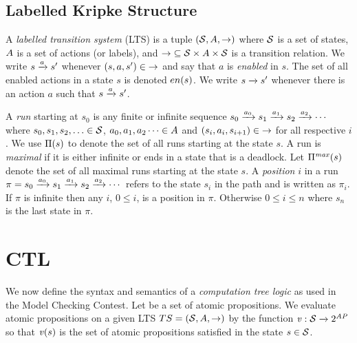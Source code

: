 \documentclass{article}
\begin{document}
\subsection{Labelled Kripke Structure}

A \emph{labelled transition system} (LTS) is a 
tuple $(\mathcal{S}, A, \mathcal{\rightarrow})$ where $\mathcal{S}$ is a 
set of states, $A$ is a set of actions (or labels), 
and $\mathcal{\rightarrow}{} \subseteq \mathcal{S} \times A \times \mathcal{S}$ is a transition relation. We write $s \rtrans[a] s'$ 
whenever $(s,a,s') \in \mathcal{\rightarrow}$ and say that $a$ is \emph{enabled} in $s$.
The set of all enabled actions in a state $s$ is denoted $en(s)$.
We write $s \rtrans s'$ whenever there is an action $a$ such that
$s \rtrans[a] s'$.

A \emph{run} starting at $s_0$ is any finite or infinite sequence
$s_0 \rtrans[a_0] s_1 \rtrans[a_1] s_2 \rtrans[a_2] \cdots$ where
$s_0, s_1, s_2, \ldots \in \mathcal{S}$, 
$a_0, a_1, a_2 \cdots \in A$ and
$(s_i,a_i,s_{i+1}) \in \mathcal{\rightarrow}$ for all respective $i$.
We use $\Pi(s)$ to denote the set of all runs starting at the state $s$.
A run is \emph{maximal} if it is either infinite or ends in a state that
is a deadlock.  Let $\Pi^{\mathit{max}}(s)$ denote the set of all maximal 
runs starting at the state $s$.
A \emph{position} $i$ in a run $\pi = 
s_0 \rtrans[a_0] s_1 \rtrans[a_1] s_2 \rtrans[a_2] \cdots$
refers to the state $s_i$ in the path and is written as $\pi_i$.
If $\pi$ is infinite then any $i$, $0 \leq i$, is a position in $\pi$.
Otherwise $0 \leq i \leq n$ where $s_n$ is the last state in $\pi$.

\section{CTL}

We now define the syntax and semantics of a \emph{computation tree logic} 
as used in the Model Checking Contest.
Let \props be a set of atomic propositions.
We evaluate atomic propositions on a given LTS
$TS = (\mathcal{S}, A, \mathcal{\rightarrow})$ 
by the function $\mathit{v} : \mathcal{S} \xrightarrow{} 2^{\mathit{AP}}$ so that
 $\mathit{v}(s)$ is the set of atomic propositions satisfied 
in the state $s \in \mathcal{S}$.
\end{document}
